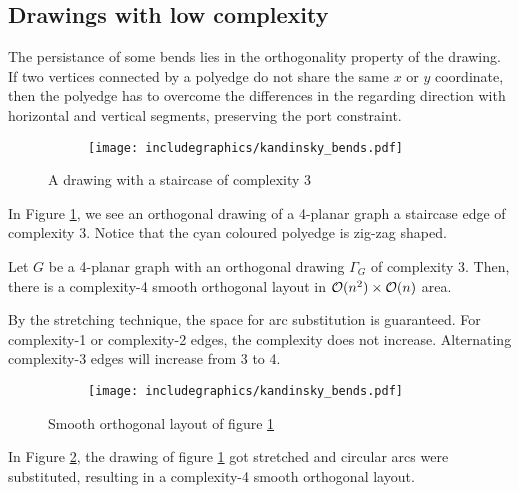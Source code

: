 \subsection{Drawings with low complexity}
The persistance of some bends lies in the orthogonality property of the drawing. If two vertices connected by a polyedge do not share the same $x$ or $y$ coordinate, then the polyedge has to overcome the differences in the regarding direction with horizontal and vertical segments, preserving the port constraint.
\begin{figure}[H]
	\centering
	\begin{subfigure}{0.6\linewidth}
		\texttt{[image: includegraphics/kandinsky\_bends.pdf]}
	\end{subfigure}
	\caption{A drawing with a staircase of complexity 3}\label{im:kandinsky_bends}
\end{figure} 
In Figure \ref{im:kandinsky_bends}, we see an orthogonal drawing of a 4-planar graph a staircase edge of complexity 3. Notice that the cyan coloured polyedge is zig-zag shaped.
\begin{theorem}
	Let $G$ be a 4-planar graph with an orthogonal drawing $\Gamma_G$ of complexity 3. Then, there is a complexity-4 smooth orthogonal layout in $\mathcal{O}(n^2) \times \mathcal{O}(n)$ area.\label{th:3to4}
\end{theorem}
\begin{sketch}
	By the stretching technique, the space for arc substitution is guaranteed. For complexity-1 or complexity-2 edges, the complexity does not increase. Alternating complexity-3 edges will increase from 3 to 4.
\end{sketch}
\begin{figure}[h]
	\centering
	\begin{subfigure}{0.6\linewidth}
		\centering
		\texttt{[image: includegraphics/kandinsky\_bends.pdf]}
	\end{subfigure}
	\caption{Smooth orthogonal layout of figure \ref{im:kandinsky_bends}}\label{im:kandinsky_bends2}
\end{figure} 
In Figure \ref{im:kandinsky_bends2}, the drawing of figure \ref{im:kandinsky_bends} got stretched and circular arcs were substituted, resulting in a complexity-4 smooth orthogonal layout.
